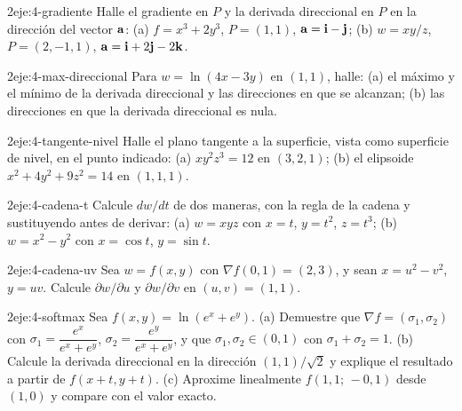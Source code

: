 \begin{ejercicio}{2}{eje:4-gradiente}
Halle el gradiente en $P$ y la derivada direccional en $P$ en la dirección del vector $\mathbf{a}$: (a) $f=x^3+2y^3$, $P=(1,1)$, $\mathbf{a}=\mathbf{i}-\mathbf{j}$; (b) $w=xy/z$, $P=(2,-1,1)$, $\mathbf{a}=\mathbf{i}+2\mathbf{j}-2\mathbf{k}$.
\end{ejercicio}

\begin{ejercicio}{2}{eje:4-max-direccional}
Para $w=\ln(4x-3y)$ en $(1,1)$, halle: (a) el máximo y el mínimo de la derivada direccional y las direcciones en que se alcanzan; (b) las direcciones en que la derivada direccional es nula.
\end{ejercicio}

\begin{ejercicio}{2}{eje:4-tangente-nivel}
Halle el plano tangente a la superficie, vista como superficie de nivel, en el punto indicado: (a) $xy^2z^3=12$ en $(3,2,1)$; (b) el elipsoide $x^2+4y^2+9z^2=14$ en $(1,1,1)$.
\end{ejercicio}

\begin{ejercicio}{2}{eje:4-cadena-t}
Calcule $dw/dt$ de dos maneras, con la regla de la cadena y sustituyendo antes de derivar: (a) $w=xyz$ con $x=t$, $y=t^2$, $z=t^3$; (b) $w=x^2-y^2$ con $x=\cos t$, $y=\sin t$.
\end{ejercicio}

\begin{ejercicio}{2}{eje:4-cadena-uv}
Sea $w=f(x,y)$ con $\nabla f(0,1)=(2,3)$, y sean $x=u^2-v^2$, $y=uv$. Calcule $\partial w/\partial u$ y $\partial w/\partial v$ en $(u,v)=(1,1)$.
\end{ejercicio}

\begin{ejercicio}{2}{eje:4-softmax}
Sea $f(x,y)=\ln(e^x+e^y)$. (a) Demuestre que $\nabla f=(\sigma_1,\sigma_2)$ con $\sigma_1=\dfrac{e^x}{e^x+e^y}$, $\sigma_2=\dfrac{e^y}{e^x+e^y}$, y que $\sigma_1,\sigma_2\in(0,1)$ con $\sigma_1+\sigma_2=1$. (b) Calcule la derivada direccional en la dirección $(1,1)/\sqrt2$ y explique el resultado a partir de $f(x+t,y+t)$. (c) Aproxime linealmente $f(1{,}1;\,-0{,}1)$ desde $(1,0)$ y compare con el valor exacto.
\end{ejercicio}

